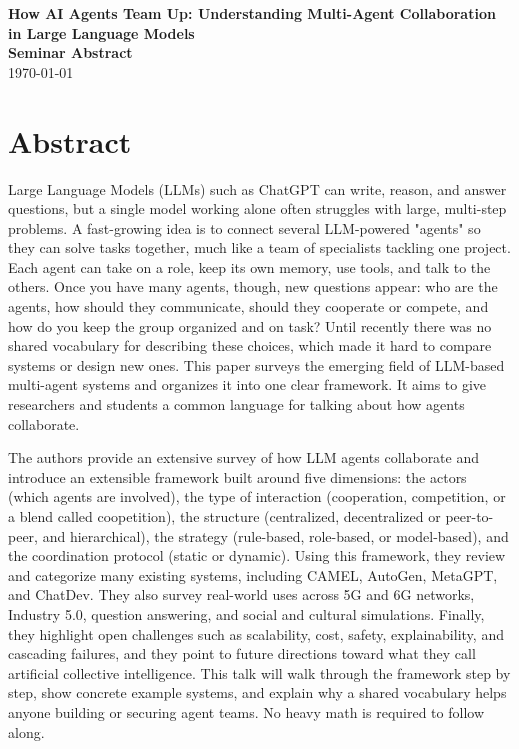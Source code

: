 \documentclass[12pt]{article}
\newcommand{\seminardate}{\today}
\begin{document}
\begin{center}
  {\LARGE\bfseries How AI Agents Team Up: Understanding Multi-Agent Collaboration in Large Language Models}\\[8pt]
  {\large\bfseries Seminar Abstract}\\[6pt]
  {\normalsize \seminardate}
\end{center}
\vspace{1.5em}

\section*{Abstract}
Large Language Models (LLMs) such as ChatGPT can write, reason, and answer questions, but a single model working alone often struggles with large, multi-step problems. A fast-growing idea is to connect several LLM-powered "agents" so they can solve tasks together, much like a team of specialists tackling one project. Each agent can take on a role, keep its own memory, use tools, and talk to the others. Once you have many agents, though, new questions appear: who are the agents, how should they communicate, should they cooperate or compete, and how do you keep the group organized and on task? Until recently there was no shared vocabulary for describing these choices, which made it hard to compare systems or design new ones. This paper surveys the emerging field of LLM-based multi-agent systems and organizes it into one clear framework. It aims to give researchers and students a common language for talking about how agents collaborate.

The authors provide an extensive survey of how LLM agents collaborate and introduce an extensible framework built around five dimensions: the actors (which agents are involved), the type of interaction (cooperation, competition, or a blend called coopetition), the structure (centralized, decentralized or peer-to-peer, and hierarchical), the strategy (rule-based, role-based, or model-based), and the coordination protocol (static or dynamic). Using this framework, they review and categorize many existing systems, including CAMEL, AutoGen, MetaGPT, and ChatDev. They also survey real-world uses across 5G and 6G networks, Industry 5.0, question answering, and social and cultural simulations. Finally, they highlight open challenges such as scalability, cost, safety, explainability, and cascading failures, and they point to future directions toward what they call artificial collective intelligence. This talk will walk through the framework step by step, show concrete example systems, and explain why a shared vocabulary helps anyone building or securing agent teams. No heavy math is required to follow along.
\end{document}
